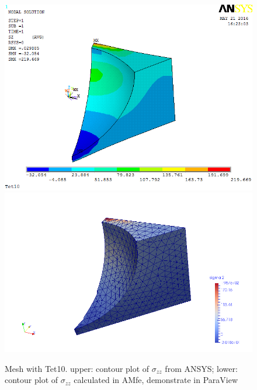 \begin{figure}[htbp]
	\begin{center}
		\includegraphics[width=13cm,clip]{Tet10_Szz.png} 		
		\includegraphics[width=13cm,clip]{Tet10_Szz_P.png} 		
		\caption{Mesh with Tet10. upper: contour plot of $\sigma_{zz}$ from ANSYS; lower: contour plot of $\sigma_{zz}$ calculated in AMfe, demonstrate in ParaView} \label{fig: Tet10_Szz}
	\end{center}
\end{figure}

